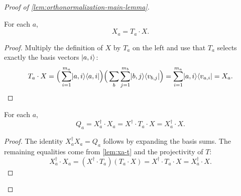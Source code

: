 \begin{proof}[Proof of \ref{lem:orthonormalization-main-lemma}]
	\begin{lemma}\label{lem:xa-t}
		\leanok
		For each $a$,
		\[
			X_a = T_a \cdot X.
		\]
	\end{lemma}
	\begin{proof}
		\leanok
		Multiply the definition of $X$ by $T_a$ on the left and use that $T_a$ selects exactly the basis vectors $\lvert a,i \rangle$:
		\[
			T_a \cdot X
			=
			\Big(\sum_{i=1}^{m_a} \lvert a,i \rangle\langle a,i \rvert\Big)
			\Big(\sum_b \sum_{j=1}^{m_b} \lvert b,j \rangle\langle v_{b,j} \rvert\Big)
			=
			\sum_{i=1}^{m_a} \lvert a,i \rangle\langle v_{a,i} \rvert
			=
			X_a.
		\]
	\end{proof}

	\begin{lemma}[$Q_a$ restated]\label{lem:qa-restated}
		\leanok
		For each $a$,
		\begin{equation*}
			Q_a = X_a^\dagger \cdot X_a = X^\dagger \cdot T_a \cdot X = X_a^\dagger \cdot X.
		\end{equation*}
	\end{lemma}
	\begin{proof}
		\leanok
		The identity $X_a^\dagger X_a = Q_a$ follows by expanding the basis sums. The remaining equalities come from \ref{lem:xa-t} and the projectivity of $T$:
		\[
			X_a^\dagger \cdot X_a
			=
			(X^\dagger \cdot T_a)(T_a \cdot X)
			=
			X^\dagger \cdot T_a \cdot X
			=
			X_a^\dagger \cdot X.
		\]
	\end{proof}


\end{proof}
